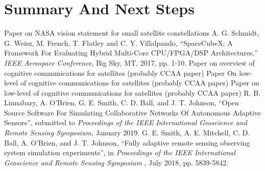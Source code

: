 \documentclass[conference]{IEEEtran}
\begin{document}

\newpage

\section{Summary And Next Steps}
\label{sec:summary}

\newpage


\small
\begin{thebibliography}{9}
 {
    Paper on NASA vision statement for small satellite constellations
  }
 {
    A. G. Schmidt, G. Weisz, M. French, T. Flatley and C. Y. Villalpando,
    ``SpaceCubeX: A Framework For Evaluating Hybrid Multi-Core CPU/FPGA/DSP
    Architectures,'' \textit{IEEE Aerospace Conference}, Big Sky, MT, 2017,
    pp. 1-10.}
 {
    Paper on overview of cognitive communications for satellites
    (probably CCAA paper)}
 {
    Paper On low-level of cognitive communications for satellites
    (probably CCAA paper)}
 {
    Paper on low-level of cognitive communications for satellites
    (probably CCAA paper)}
 {
    R. B. Linnabary, A. O'Brien, G. E. Smith, C. D. Ball, and J. T. Johnson,
    ``Open Source Software For Simulating Collaborative Networks Of Autonomous
    Adaptive Sensors'', submitted to {\it Proceedings of the IEEE International
      Geoscience and Remote Sensing Symposium}, January 2019.}
 {
    G. E. Smith, A. E. Mitchell, C. D. Ball, A. O'Brien, and J. T. Johnson,
    ``Fully adaptive remote sensing observing system simulation experiments'',
    in {
      \it Proceedings of the IEEE International Geoscience and Remote Sensing
      Symposium} , July 2018, pp. 5839-5842.}
\end{thebibliography}
\end{document}
